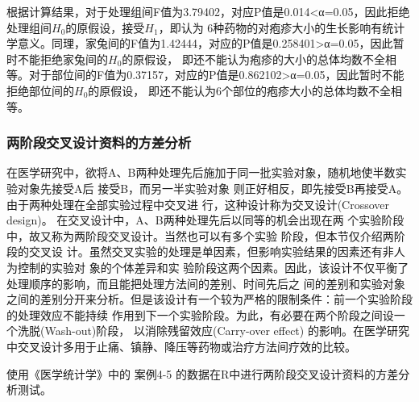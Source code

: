 \documentclass[
]{article}
\begin{document}
根据计算结果，对于处理组间F值为3.79402，对应P值是0.014\textless α=0.05，因此拒绝处理组间\(H_0\)的原假设，接受\(H_1\)，即认为
6种药物的对疱疹大小的生长影响有统计学意义。同理，家兔间的F值为1.42444，对应的P值是0.258401\textgreater α=0.05，因此暂时不能拒绝家兔间的\(H_0\)的原假设，
即还不能认为疱疹的大小的总体均数不全相等。对于部位间的F值为0.37157，对应的P值是0.862102\textgreater α=0.05，因此暂时不能拒绝部位间的\(H_0\)的原假设，
即还不能认为6个部位的疱疹大小的总体均数不全相等。

\hypertarget{ux4e24ux9636ux6bb5ux4ea4ux53c9ux8bbeux8ba1ux8d44ux6599ux7684ux65b9ux5deeux5206ux6790}{%
\subsubsection{两阶段交叉设计资料的方差分析}\label{ux4e24ux9636ux6bb5ux4ea4ux53c9ux8bbeux8ba1ux8d44ux6599ux7684ux65b9ux5deeux5206ux6790}}

在医学研究中，欲将A、B两种处理先后施加于同一批实验对象，随机地使半数实验对象先接受A后 接受B，而另一半实验对象
则正好相反，即先接受B再接受A。由于两种处理在全部实验过程中交叉进 行，这种设计称为交叉设计(Crossover design)。
在交叉设计中，A、B两种处理先后以同等的机会出现在两 个实验阶段中，故又称为两阶段交叉设计。当然也可以有多个实验
阶段，但本节仅介绍两阶段的交叉设 计。虽然交叉实验的处理是单因素，但影响实验结果的因素还有非人为控制的实验对
象的个体差异和实 验阶段这两个因素。因此，该设计不仅平衡了处理顺序的影响，而且能把处理方法间的差别、时间先后之
间的差别和实验对象之间的差别分开来分析。但是该设计有一个较为严格的限制条件：前一个实验阶段的处理效应不能持续
作用到下一个实验阶段。为此，有必要在两个阶段之间设一个洗脱(Wash-out)阶段， 以消除残留效应(Carry-over effect)
的影响。在医学研究中交叉设计多用于止痛、镇静、降压等药物或治疗方法间疗效的比较。

使用《医学统计学》中的 案例4-5 的数据在R中进行两阶段交叉设计资料的方差分析测试。
\end{document}
